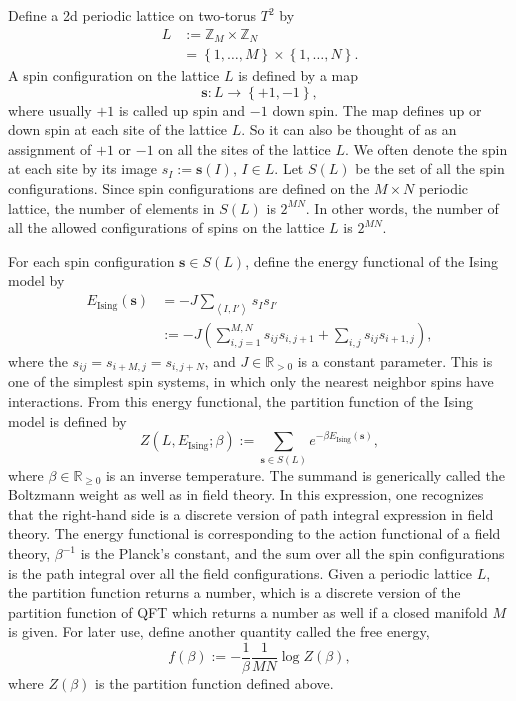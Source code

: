 Define a 2d periodic lattice on two-torus $T^{2}$ by
\begin{align}
L
  & :=  \mathbb{Z}_{M}\times\mathbb{Z}_{N}  \nonumber \\
  & =   \left\{ 1,\ldots,M\right\} \times\left\{ 1,\ldots,N\right\} .
\end{align}
 A spin configuration on the lattice $L$ is defined by a map
\begin{equation}
  \mathbf{s}  :  L  \longrightarrow  \left\{ +1,-1\right\} ,
\end{equation}
where usually $+1$ is called up spin and $-1$ down spin. The
map defines up or down spin at each site of the lattice $L$. So it
can also be thought of as an assignment of $+1$ or $-1$ on all the
sites of the lattice $L$. We often denote the spin at each site by
its image $s_{I} := \mathbf{s}\left(I\right),\,I\in L$. Let $S\left(L\right)$
be the set of all the spin configurations. Since spin configurations
are defined on the $M\times N$ periodic lattice, the number of elements
in $S\left(L\right)$ is $2^{MN}$. In other words, the number of
all the allowed configurations of spins on the lattice $L$ is $2^{MN}$.

For each spin configuration $\mathbf{s}\in S\left(L\right)$, define
the energy functional of the Ising model by
\begin{align}
  E_{\mathrm{Ising}}\left(\mathbf{s}\right)
  & =   -J  \sum_{\left\langle I,I'\right\rangle } s_{I}s_{I'}  \nonumber \\
  & :=  -J  \left( \sum_{i,j=1}^{M,N}s_{ij}s_{i,j+1}+\sum_{i,j}s_{ij}s_{i+1,j} \right),
\end{align}
 where the $s_{ij}=s_{i+M,j}=s_{i,j+N}$, and $J\in\mathbb{R}_{>0}$
is a constant parameter. This is one of the simplest spin systems,
in which only the nearest neighbor spins have interactions. From this
energy functional, the partition function of the Ising model is defined
by
\begin{equation}
  Z\left(L,E_{\mathrm{Ising}};\beta\right)  :=  \sum_{\mathbf{s}\in S\left(L\right)}  e^{-\beta E_{\mathrm{Ising}}\left(\mathbf{s}\right)},
\end{equation}
 where $\beta\in\mathbb{R}_{\geq0}$ is an inverse temperature. The
summand is generically called the Boltzmann weight as well as in field
theory. In this expression, one recognizes that the right-hand side
is a discrete version of path integral expression in field theory.
The energy functional is corresponding to the action functional of
a field theory, $\beta^{-1}$ is the Planck's constant, and the sum
over all the spin configurations is the path integral over all the
field configurations. Given a periodic lattice $L$, the partition
function returns a number, which is a discrete version of the partition
function of QFT which returns a number as well if a closed manifold
$M$ is given. For later use, define another quantity called the free
energy,
\begin{equation}
  f\left(\beta\right)  :=  -\frac{1}{\beta}\frac{1}{MN}\log Z\left(\beta\right),
\end{equation}
 where $Z\left(\beta\right)$ is the partition function defined above.

